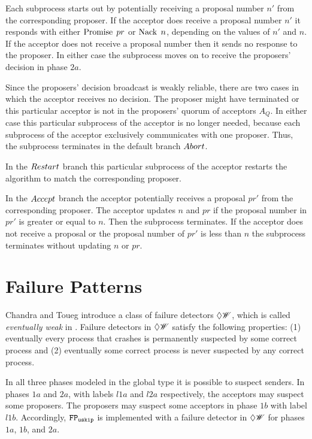 Each subprocess starts out by potentially receiving a proposal number $n'$ from the corresponding proposer.
If the acceptor does receive a proposal number $n'$ it responds with either $\operatorname{Promise}\; pr$ or $\operatorname{Nack}\; n$, depending on the values of $n'$ and $n$.
If the acceptor does not receive a proposal number then it sends no response to the proposer.
In either case the subprocess moves on to receive the proposers' decision in phase $2a$.

Since the proposers' decision broadcast is weakly reliable, there are two cases in which the acceptor receives no decision.
The proposer might have terminated or this particular acceptor is not in the proposers' quorum of acceptors $A_Q$.
In either case this particular subprocess of the acceptor is no longer needed, because each subprocess of the acceptor exclusively communicates with one proposer.
Thus, the subprocess terminates in the default branch $\mathnormal{Abort}$.

In the $\mathnormal{Restart}$ branch this particular subprocess of the acceptor restarts the algorithm to match the corresponding proposer.

In the $\mathnormal{Accept}$ branch the acceptor potentially receives a proposal $pr'$ from the corresponding proposer.
The acceptor updates $n$ and $pr$ if the proposal number in $pr'$ is greater or equal to $n$.
Then the subprocess terminates.
If the acceptor does not receive a proposal or the proposal number of $pr'$ is less than $n$ the subprocess terminates without updating $n$ or $pr$.

\section{Failure Patterns}
Chandra and Toueg introduce a class of failure detectors $\Diamond\mathscr{W}$, which is called \emph{eventually weak} in \cite{failure_detectors}.
Failure detectors in $\Diamond\mathscr{W}$ satisfy the following properties: (1) eventually every process that crashes is permanently suspected by some correct process and (2) eventually some correct process is never suspected by any correct process.

In all three phases modeled in the global type it is possible to suspect senders.
In phases $1a$ and $2a$, with labels $l1a$ and $l2a$ respectively, the acceptors may suspect some proposers.
The proposers may suspect some acceptors in phase $1b$ with label $l1b$.
Accordingly, $\mathtt{FP_{uskip}}$ is implemented with a failure detector in $\Diamond\mathscr{W}$ for phases $1a$, $1b$, and $2a$.

